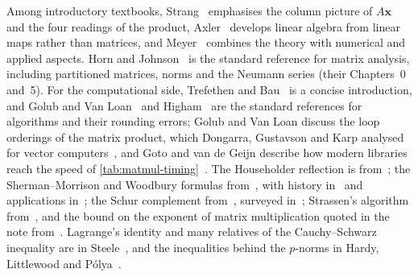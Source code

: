 Among introductory textbooks, Strang~\cite{strang2016} emphasises the column picture of $A\mathbf x$ and the four readings of the product, Axler~\cite{axler2024} develops linear algebra from linear maps rather than matrices, and Meyer~\cite{meyer2000} combines the theory with numerical and applied aspects. Horn and Johnson~\cite{horn2013} is the standard reference for matrix analysis, including partitioned matrices, norms and the Neumann series (their Chapters~0 and~5). For the computational side, Trefethen and Bau~\cite{trefethen1997} is a concise introduction, and Golub and Van Loan~\cite{golub2013} and Higham~\cite{higham2002accuracy} are the standard references for algorithms and their rounding errors; Golub and Van Loan discuss the loop orderings of the matrix product, which Dongarra, Gustavson and Karp analysed for vector computers~\cite{dongarra1984}, and Goto and van de Geijn describe how modern libraries reach the speed of \cref{tab:matmul-timing}~\cite{goto2008}. The Householder reflection is from~\cite{householder1958}; the Sherman--Morrison and Woodbury formulas from~\cite{sherman1950,woodbury1950}, with history in~\cite{henderson1981} and applications in~\cite{hager1989}; the Schur complement from~\cite{schur1917}, surveyed in~\cite{zhang2005schur}; Strassen's algorithm from~\cite{strassen1969}, and the bound on the exponent of matrix multiplication quoted in the note from~\cite{alman2025}. Lagrange's identity and many relatives of the Cauchy--Schwarz inequality are in Steele~\cite{steele2004}, and the inequalities behind the $p$-norms in Hardy, Littlewood and P\'olya~\cite{hardy1952inequalities}.

\chapterreferences
